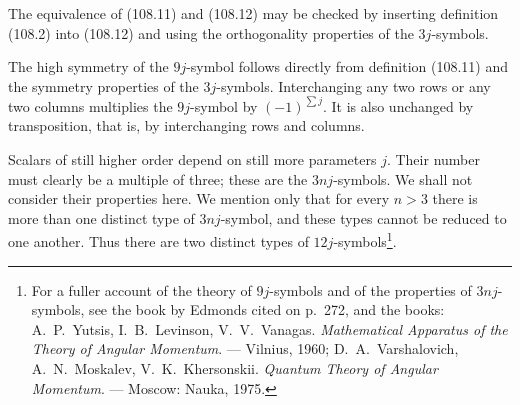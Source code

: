 The equivalence of (108.11) and (108.12) may be checked by inserting definition (108.2) into (108.12) and using the orthogonality properties of the $3j$-symbols.

The high symmetry of the $9j$-symbol follows directly from definition (108.11) and the symmetry properties of the $3j$-symbols. Interchanging any two rows or any two columns multiplies the $9j$-symbol by $(-1)^{\sum j}$. It is also unchanged by transposition, that is, by interchanging rows and columns.

Scalars of still higher order depend on still more parameters $j$. Their number must clearly be a multiple of three; these are the $3nj$-symbols. We shall not consider their properties here. We mention only that for every $n>3$ there is more than one distinct type of $3nj$-symbol, and these types cannot be reduced to one another. Thus there are two distinct types of $12j$-symbols\footnote{For a fuller account of the theory of $9j$-symbols and of the properties of $3nj$-symbols, see the book by Edmonds cited on p.~272, and the books: A.~P.~Yutsis, I.~B.~Levinson, V.~V.~Vanagas. \emph{Mathematical Apparatus of the Theory of Angular Momentum}. --- Vilnius, 1960; D.~A.~Varshalovich, A.~N.~Moskalev, V.~K.~Khersonskii. \emph{Quantum Theory of Angular Momentum}. --- Moscow: Nauka, 1975.}.
